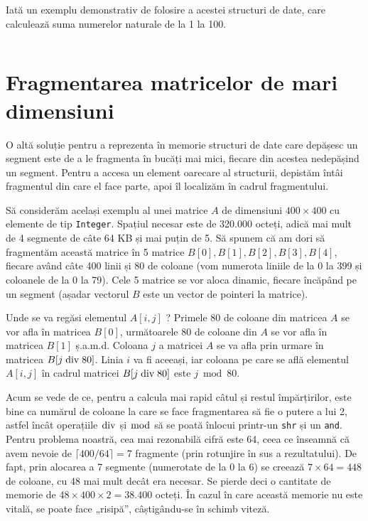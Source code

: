 Iată un exemplu demonstrativ de folosire a acestei structuri de date, care
calculează suma numerelor naturale de la 1 la 100.

\inputminted{pascal}{src/chapter3-3.pas}

\section{Fragmentarea matricelor de mari dimensiuni}

O altă soluție pentru a reprezenta în memorie structuri de date care depășesc
un segment este de a le fragmenta în bucăți mai mici, fiecare din acestea
nedepășind un segment. Pentru a accesa un element oarecare al structurii,
depistăm întâi fragmentul din care el face parte, apoi îl localizăm în cadrul
fragmentului.

Să considerăm același exemplu al unei matrice $A$ de dimensiuni $400 \times
400$ cu elemente de tip {\tt Integer}. Spațiul necesar este de 320.000 octeți,
adică mai mult de 4 segmente de câte 64 KB și mai puțin de 5. Să spunem că am
dori să fragmentăm această matrice în 5 matrice $B[0], B[1], B[2], B[3],
B[4]$, fiecare având câte 400 linii și 80 de coloane (vom numerota liniile de
la 0 la 399 și coloanele de la 0 la 79).  Cele 5 matrice se vor aloca dinamic,
fiecare încăpând pe un segment (așadar vectorul $B$ este un vector de pointeri
la matrice).

Unde se va regăsi elementul $A[i,j]$ ? Primele 80 de coloane din matricea $A$
se vor afla în matricea $B[0]$, următoarele 80 de coloane din $A$ se vor afla
în matricea $B[1]$ ș.a.m.d. Coloana $j$ a matricei $A$ se va afla prin urmare
în matricea $B[j \bdiv 80]$. Linia $i$ va fi aceeași, iar coloana pe care se
află elementul $A[i,j]$ în cadrul matricei $B[j \bdiv 80]$ este $j \bmod 80$.

Acum se vede de ce, pentru a calcula mai rapid câtul și restul împărțirilor,
este bine ca numărul de coloane la care se face fragmentarea să fie o putere a
lui 2, astfel încât operațiile $\bdiv$ și $\bmod$ să se poată înlocui
printr-un {\tt shr} și un {\tt and}. Pentru problema noastră, cea mai
rezonabilă cifră este 64, ceea ce înseamnă că avem nevoie de $\lceil 400/64
\rceil = 7$ fragmente (prin rotunjire în sus a rezultatului). De fapt, prin
alocarea a 7 segmente (numerotate de la 0 la 6) se creează $7 \times 64 = 448$
de coloane, cu 48 mai mult decât era necesar. Se pierde deci o cantitate de
memorie de $48 \times 400 \times 2 = 38.400$ octeți. În cazul în care această
memorie nu este vitală, se poate face „risipă”, câștigându-se în schimb
viteză.

